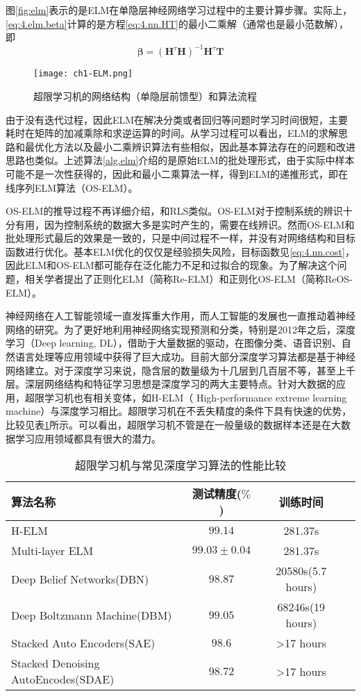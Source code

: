 图\eqref{fig:elm}表示的是ELM在单隐层神经网络学习过程中的主要计算步骤。实际上，\eqref{eq:4.elm.beta}计算的是方程\eqref{eq:4.nn.HT}的最小二乘解（通常也是最小范数解），即
\begin{equation}
\bm{\beta}=(\bm{H}^{\tau}\bm{H})^{-1}\bm{H}^{\tau}\bm{T} 
\end{equation}

\begin{figure}
 \centering
 \texttt{[image: ch1-ELM.png]}
 \caption{超限学习机的网络结构（单隐层前馈型）和算法流程}\label{fig:elm}
\end{figure}

由于没有迭代过程，因此ELM在解决分类或者回归等问题时学习时间很短，主要耗时在矩阵的加减乘除和求逆运算的时间。从学习过程可以看出，ELM的求解思路和最优化方法以及最小二乘辨识算法有些相似，因此基本算法存在的问题和改进思路也类似。上述算法\ref{alg.elm}介绍的是原始ELM的批处理形式，由于实际中样本可能不是一次性获得的，因此和最小二乘算法一样，得到ELM的递推形式，即在线序列ELM算法（OS-ELM）。

OS-ELM的推导过程不再详细介绍，和RLS类似。OS-ELM对于控制系统的辨识十分有用，因为控制系统的数据大多是实时产生的，需要在线辨识。然而OS-ELM和批处理形式最后的效果是一致的，只是中间过程不一样，并没有对网络结构和目标函数进行优化。基本ELM优化的仅仅是经验损失风险，目标函数见\eqref{eq:4.nn.cost}，因此ELM和OS-ELM都可能存在泛化能力不足和过拟合的现象。为了解决这个问题，相关学者提出了正则化ELM（简称Re-ELM）和正则化OS-ELM（简称ReOS-ELM）。

神经网络在人工智能领域一直发挥重大作用，而人工智能的发展也一直推动着神经网络的研究。为了更好地利用神经网络实现预测和分类，特别是2012年之后，深度学习（Deep learning, DL），借助于大量数据的驱动，在图像分类、语音识别、自然语言处理等应用领域中获得了巨大成功。目前大部分深度学习算法都是基于神经网络建立。对于深度学习来说，隐含层的数量级为十几层到几百层不等，甚至上千层。深层网络结构和特征学习思想是深度学习的两大主要特点。针对大数据的应用，超限学习机也有相关变体，如H-ELM（
High-performance extreme learning machine）与深度学习相比。超限学习机在不丢失精度的条件下具有快速的优势，比较见表\ref{tab:elm-dl}所示。可以看出，超限学习机不管是在一般量级的数据样本还是在大数据学习应用领域都具有很大的潜力。
\begin{table}
\centering
\caption{超限学习机与常见深度学习算法的性能比较}\label{tab:elm-dl}
\begin{tabular*}{0.9\textwidth}{@{\extracolsep{\fill}}lccc}
\toprule
算法名称	&测试精度($\%$)	&训练时间 \\
\midrule
H-ELM	&$99.14$	&281.37s\\
Multi-layer ELM	&$99.03\pm0.04$	&281.37s\\
Deep Belief Networks(DBN)	&$98.87$	&20580s(5.7 hours)\\
Deep Boltzmann Machine(DBM)	&$99.05$	&68246s(19 hours)\\
Stacked Auto Encoders(SAE)	&$98.6$	&>17 hours\\
Stacked Denoising AutoEncodes(SDAE)	&$98.72$	&>17 hours\\
\bottomrule
\end{tabular*}
\end{table}

